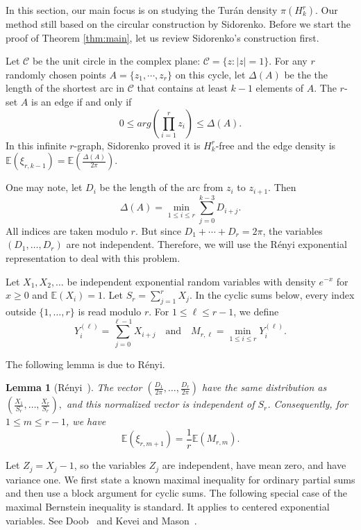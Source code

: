 \documentclass[12pt,a4paper]{article}
\numberwithin{equation}{section}
\newtheorem{lemma}[theorem]{Lemma}
\theoremstyle{definition}
\theoremstyle{remark}
\begin{document}
In this section,  our main focus is on studying the Tur\'an density $\pi(H_k^r)$. Our method still based on the circular construction by Sidorenko.  Before we start the proof of Theorem \ref{thm:main}, let us review Sidorenko's construction first.
 
Let $\mathcal C$ be the unit circle in the complex plane: $\mathcal C=\{z: |z|=1\}$. For any $r$  randomly chosen points $A=\{z_1,\cdots,z_r\}$ on this cycle, let  $\Delta(A)$ be the the length of the shortest arc in $\mathcal C$ that contains at least $k-1$ elements of $A$.
The $r$-set $A$ is an edge if and only if 
\[0\le arg(\prod_{i=1}^{r}z_i)\le \Delta(A).\]
In this infinite $r$-graph, Sidorenko proved it is $H_k^r$-free and the edge density is $\mathbb{E}(\xi_{r,k-1})=\mathbb{E}(\frac{\Delta(A)}{2\pi})$.


One may note, let $D_i$ be the length of the arc from $z_i$ to $z_{i+1}$. Then
\[\Delta(A)=\min_{1\le i\le r} \sum_{j=0}^{k-3}D_{i+j}.\]
All indices are taken modulo $r$. But since $D_1+\cdots +D_r=2\pi$, the variables $(D_1,\ldots, D_r)$ are not independent. Therefore, we will use the R\'enyi exponential representation to deal with this problem.

Let $X_1,X_2,\ldots$ be independent exponential random variables with density $e^{-x}$ for $x\ge0$ and $\mathbb{E}(X_i)=1$.  
Let $S_r=\sum_{j=1}^rX_j$.  In the cyclic sums below, every index outside $\{1,\ldots,r\}$ is read modulo $r$.
For $1\le\ell\le r-1$, we define
$$Y_i^{(\ell)}=\sum_{j=0}^{\ell-1}X_{i+j}
\quad \text{and} \quad
M_{r,\ell}=\min_{1\le i\le r}Y_i^{(\ell)}.$$

The following lemma is due to R\'enyi.
\begin{lemma}[R\'enyi~\cite{Renyi1953}]\label{lem:renyi1953}
The vector $(\frac{D_1}{2\pi },\ldots, \frac{D_r}{2\pi })$ have the same distribution as
$\left(\frac{X_1}{S_r},\ldots,\frac{X_r}{S_r}\right),$
and this normalized vector is independent of $S_r$.  Consequently, for $1\le m\le r-1$, we have
\begin{equation}\label{eq:spacing-expectation}
        \mathbb{E}(\xi_{r,m+1})=\frac1r\mathbb{E}(M_{r,m}).
\end{equation}
\end{lemma}


\medskip

Let $Z_j=X_j-1$, so the variables $Z_j$ are independent, have mean zero, and have variance one.  We first state a known maximal inequality for ordinary partial sums and then use a block argument for cyclic sums. The following special case of the maximal Bernstein inequality is standard. 
It applies to centered exponential variables. 
See Doob~\cite{Doob1953} and Kevei and Mason~\cite{KeveiMason2011}.
\end{document}
